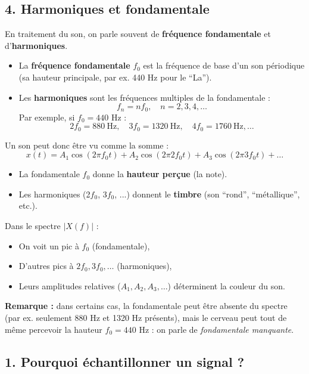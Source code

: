 \subsection*{4. Harmoniques et fondamentale}

En traitement du son, on parle souvent de \textbf{fréquence fondamentale} et d'\textbf{harmoniques}.

\begin{itemize}
    \item La \textbf{fréquence fondamentale} $f_0$ est la fréquence de base d’un son périodique (sa hauteur principale, par ex. 440 Hz pour le ``La'').
    \item Les \textbf{harmoniques} sont les fréquences multiples de la fondamentale :
    \[
      f_n = n f_0, \quad n = 2,3,4,\dots
    \]
    Par exemple, si $f_0 = 440$ Hz :
    \[
      2f_0 = 880~\text{Hz},\quad 3f_0 = 1320~\text{Hz},\quad 4f_0 = 1760~\text{Hz}, \dots
    \]
\end{itemize}

Un son peut donc être vu comme la somme :
\[
x(t) = A_1 \cos(2\pi f_0 t) + A_2 \cos(2\pi 2f_0 t) + A_3 \cos(2\pi 3f_0 t) + \dots
\]

\begin{itemize}
    \item La fondamentale $f_0$ donne la \textbf{hauteur perçue} (la note).
    \item Les harmoniques (2$f_0$, 3$f_0$, ...) donnent le \textbf{timbre} (son ``rond'', ``métallique'', etc.). \\
\end{itemize}

Dans le spectre $|X(f)|$ :
\begin{itemize}
    \item On voit un pic à $f_0$ (fondamentale),
    \item D’autres pics à $2f_0, 3f_0, \dots$ (harmoniques),
    \item Leurs amplitudes relatives ($A_1, A_2, A_3, \dots$) déterminent la couleur du son. \\
\end{itemize}

\textbf{Remarque :} dans certains cas, la fondamentale peut être absente du spectre (par ex. seulement 880 Hz et 1320 Hz présents), mais le cerveau peut tout de même percevoir la hauteur $f_0 = 440$ Hz : on parle de \emph{fondamentale manquante}.

\newpage

\subsection*{1. Pourquoi échantillonner un signal ?}

